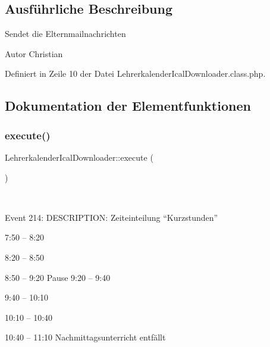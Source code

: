 \subsection{Ausführliche Beschreibung}
Sendet die Elternmailnachrichten \begin{DoxyAuthor}{Autor}
Christian 
\end{DoxyAuthor}


Definiert in Zeile 10 der Datei Lehrerkalender\+Ical\+Downloader.\+class.\+php.



\subsection{Dokumentation der Elementfunktionen}
\mbox{\label{class_lehrerkalender_ical_downloader_a07a5b76e1a4b0dcdfe2fc1dbb4b75816}} 
\subsubsection{\texorpdfstring{execute()}{execute()}}
{\footnotesize\ttfamily Lehrerkalender\+Ical\+Downloader\+::execute (\begin{DoxyParamCaption}{ }\end{DoxyParamCaption})}

~\newline


Event 214\+: D\+E\+S\+C\+R\+I\+P\+T\+I\+ON\+: Zeiteinteilung “\+Kurzstunden”
\begin{DoxyEnumerate}
\item 7\+:50 – 8\+:20
\item 8\+:20 – 8\+:50
\item 8\+:50 – 9\+:20 Pause 9\+:20 – 9\+:40
\item 9\+:40 – 10\+:10
\item 10\+:10 – 10\+:40
\item 10\+:40 – 11\+:10 Nachmittagsunterricht entfällt
\end{DoxyEnumerate}

